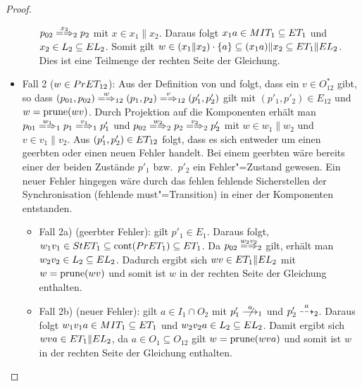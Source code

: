 \begin{proof}
\begin{itemize}
\begin{itemize}
        $p_{02}\weakmay[x_2]_2 p_2$ mit $x\in x_1\|x_2$. Daraus folgt $x_1a\in
        MIT _1 \subseteq ET _1$ und $x_2\in L_2\subseteq EL _2$. Somit gilt
        $w\in (x_1\|x_2) \cdot \{a\} \subseteq (x_1a)\|x_2\subseteq ET _1\|EL
        _2$. Dies ist eine Teilmenge der rechten Seite der Gleichung.
    \end{itemize}
  \item Fall 2 ($w\in PrET _{12}$): Aus der Definition von \PrET{} und \prune{}
    folgt, dass ein $v\in O_{12}^*$ gibt, so dass $(p_{01},p_{02})
      \weakmay[w]_{12} (p_1,p_2) \weakmay[v]_{12} (p'_1,p'_2)$ gilt mit
      $(p'_1,p'_2)\in E_{12}$ und $w=\mathrm{prune} (wv)$. Durch Projektion auf die
      Komponenten erhält man $p_{01} \weakmay[w_1]_1 p_1 \weakmay[v_1]_1 p'_1$
      und $p_{02} \weakmay[w_2]_2 p_2 \weakmay[v_2]_2 p'_2$ mit $w\in w_1\|w_2$
      und $v\in v_1\|v_2$. Aus $(p'_1,p'_2)\in ET _{12}$ folgt, dass es sich
      entweder um einen geerbten oder einen neuen Fehler handelt. Bei einem
      geerbten wäre bereits einer der beiden Zustände $p'_1$ bzw.\ $p'_2$ ein
      Fehler"=Zustand gewesen. Ein neuer Fehler hingegen wäre
      durch das fehlen fehlende Sicherstellen der Synchronisation (fehlende
      must"=Transition) in einer der Komponenten entstanden.
    \begin{itemize}
      \item Fall 2a) (geerbter Fehler): \OBdA{} gilt $p'_1\in E_1$. Daraus
        folgt, $w_1v_1\in StET_1 \subseteq \mathrm{cont} (PrET _1) \subseteq ET _1$.
        Da $p_{02} \weakmay[w_2v_2]_2$ gilt, erhält man $w_2v_2\in L_2\subseteq
        EL _2$. Dadurch ergibt sich $wv\in ET _1\|EL _2$ mit $w=\mathrm{prune} (wv)$
        und somit ist $w$ in der rechten Seite der Gleichung enthalten.
      \item Fall 2b) (neuer Fehler): \OBdA{} gilt $a\in I_1\cap O_2$ mit
        $p'_1\nmust[a]_1$ und $p'_2\may[a]_2$. Daraus folgt $w_1v_1a\in MIT _1
        \subseteq ET _1$ und $w_2v_2a\in L_2 \subseteq EL _2$. Damit ergibt
        sich $wva\in ET _1\|EL_2$, da $a\in O_1\subseteq O_{12}$ gilt
        $w=\mathrm{prune} (wva)$ und somit ist $w$ in der rechten Seite der Gleichung
        enthalten.
    \end{itemize}
  \end{itemize}


\end{proof}
